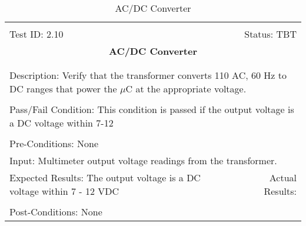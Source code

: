 \documentclass[titlepage]{article}
\begin{document}
\begin{center}%
\begin{table}[h!]
\begin{tabular}{|l r|}\hline&\\[-2mm]
	Test ID: 2.10	&Status: TBT\\[-3mm]
	\multicolumn{2}{|c|}{\textbf{\large{AC/DC Converter}}}\\&\\\hline&\\[-3mm]
	\multicolumn{2}{|p{\textwidth}|}{Description: Verify that the transformer converts 110 AC, 60 Hz to DC ranges that power the $\mu$C at the appropriate voltage.}\\[1mm]\hline&\\[-3mm]
	\multicolumn{2}{|p{\textwidth}|}{Pass/Fail Condition: This condition is passed if the output voltage is a DC voltage within 7-12}\\[1mm]\hline&\\[-3mm]
	\multicolumn{2}{|p{\textwidth}|}{Pre-Conditions: None}\\[4mm]
	\multicolumn{2}{|p{\textwidth}|}{Input: Multimeter output voltage readings from the transformer.}\\[2mm]\hline
	\multicolumn{1}{|p{0.49\textwidth}}{Expected Results: The output voltage is a DC voltage within 7 - 12 VDC}	&\multicolumn{1}{|p{0.45\textwidth}|}{Actual Results:}\\\hline&\\[-3mm]
	\multicolumn{2}{|p{\textwidth}|}{Post-Conditions: None}\\\hline
\end{tabular}
\caption{AC/DC Converter}
\end{table}
\end{center}
\end{document}

